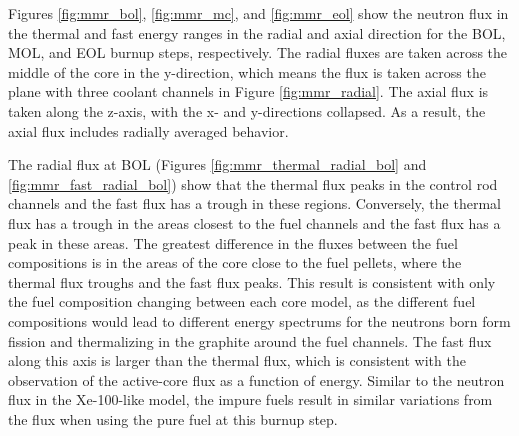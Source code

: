 Figures \ref{fig:mmr_bol}, \ref{fig:mmr_mc}, and \ref{fig:mmr_eol} show 
the neutron flux in the thermal and fast energy ranges in the radial and axial 
direction for the \gls{BOL}, \gls{MOL}, and \gls{EOL} burnup steps, 
respectively. The radial fluxes are taken 
across the middle of the core in the y-direction, which means the flux 
is taken across the plane with three coolant channels in Figure 
\ref{fig:mmr_radial}. The axial flux is taken along the z-axis, with the 
x- and y-directions collapsed. As a result, the axial flux includes 
radially averaged behavior. 

The radial flux at \gls{BOL} (Figures \ref{fig:mmr_thermal_radial_bol} and 
\ref{fig:mmr_fast_radial_bol}) show that the thermal flux peaks in the 
control rod channels and the fast flux has a trough in these regions. 
Conversely, the thermal flux has a trough in the areas closest to the fuel 
channels and the fast flux has a peak in these areas.
The greatest difference in the 
fluxes between the fuel compositions is in the areas of the core close 
to the fuel pellets, where the thermal flux troughs and the fast flux 
peaks. This result is consistent with only the fuel 
composition changing between each core model, as the different fuel 
compositions would lead to different energy spectrums for the neutrons 
born form fission and thermalizing in the graphite around the fuel channels.
The fast flux along this axis is larger than the thermal flux, which is 
consistent with the observation of the active-core flux as a function of 
energy. Similar to the neutron flux in the Xe-100-like model, the 
impure fuels result in similar variations from the flux when 
using the pure fuel at this burnup step.

